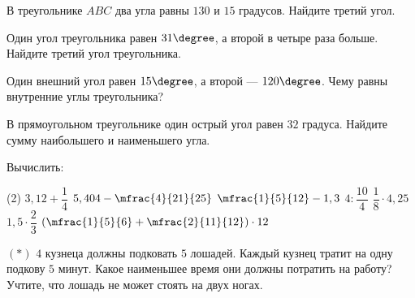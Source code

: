 \begin{homework}[number=1]
	\begin{listofex}
		\item В треугольнике \( ABC \) два угла равны \( 130\) и \( 15 \) градусов. Найдите третий угол.
		\item Один угол треугольника равен \( 31\degree \), а второй в четыре раза больше. Найдите третий угол треугольника.
		\item Один внешний угол равен \( 15\degree \), а второй --- \( 120\degree \). Чему равны внутренние углы треугольника?
		\item В прямоугольном треугольнике один острый угол равен \( 32 \) градуса. Найдите сумму наибольшего и наименьшего угла.
		\item Вычислить:
		\begin{tasks}(2)
			\task \( 3,12+\dfrac{1}{4} \)
			\task \( 5,404-\mfrac{4}{21}{25} \)
			\task \( \mfrac{1}{5}{12}-1,3\)
			\task \( 4 : \dfrac{10}{4} \)
			\task \( \dfrac{1}{8} \cdot 4,25 \)
			\task \( 1,5 \cdot \dfrac{2}{3} \)
			\task \( \left(  \mfrac{1}{5}{6} + \mfrac{2}{11}{12} \right) \cdot 12 \)
		\end{tasks}
		\item \( (*) \) \(4\) кузнеца должны подковать \(5\) лошадей. Каждый кузнец тратит на одну подкову \(5\) минут. Какое наименьшее время они должны потратить на работу? Учтите, что лошадь не может стоять на двух ногах.
	\end{listofex}
\end{homework}

